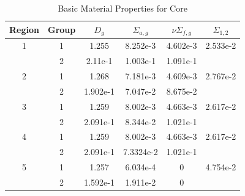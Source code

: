 \begin{table}[h]
\centering
\begin{tabular}{c c | c c c c}
Region & Group & $D_g$ & $\Sigma_{a,g}$ & $\nu\Sigma_{f,g}$ & $\Sigma_{1,2}$ \\ \hline
1 & 1 & 1.255 & 8.252e-3 & 4.602e-3 & 2.533e-2 \\
 & 2 & 2.11e-1 & 1.003e-1 & 1.091e-1 & \\ \hline
2 & 1 & 1.268 & 7.181e-3 & 4.609e-3 & 2.767e-2 \\
 & 2 & 1.902e-1 & 7.047e-2 & 8.675e-2 & \\ \hline
3 & 1 & 1.259 & 8.002e-3 & 4.663e-3 & 2.617e-2 \\
 & 2 & 2.091e-1 & 8.344e-2 & 1.021e-1 & \\ \hline
4 & 1 & 1.259 & 8.002e-3 & 4.663e-3 & 2.617e-2 \\
 & 2 & 2.091e-1 & 7.3324e-2 & 1.021e-1 & \\ \hline
5 & 1 & 1.257 & 6.034e-4 & 0 & 4.754e-2 \\
 & 2 & 1.592e-1 & 1.911e-2 & 0 & 
\end{tabular}
\caption{Basic Material Properties for Core}
\label{tab:coremats}
\end{table}

